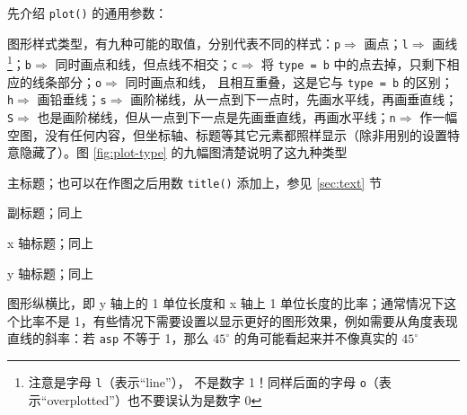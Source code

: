 \documentclass[
  b5paper,
  UTF8,twoside]{book}
\providecommand{\tightlist}{%
  \setlength{\itemsep}{0pt}\setlength{\parskip}{0pt}}
\begin{document}
先介绍 \texttt{plot()} 的通用参数：

\begin{description}
\tightlist
\item[\texttt{type}]
图形样式类型，有九种可能的取值，分别代表不同的样式：\texttt{\textquotesingle{}p\textquotesingle{}}\(\Rightarrow\) 画点；\texttt{\textquotesingle{}l\textquotesingle{}}\(\Rightarrow\) 画线 \footnote{注意是字母 \texttt{l}（表示``line''）， 不是数字 1！同样后面的字母 \texttt{o}（表示``overplotted''）也不要误认为是数字 0}；\texttt{\textquotesingle{}b\textquotesingle{}}\(\Rightarrow\) 同时画点和线，但点线不相交；\texttt{\textquotesingle{}c\textquotesingle{}}\(\Rightarrow\) 将 \texttt{type\ =\ \textquotesingle{}b\textquotesingle{}} 中的点去掉，只剩下相应的线条部分；\texttt{\textquotesingle{}o\textquotesingle{}}\(\Rightarrow\) 同时画点和线， 且相互重叠，这是它与 \texttt{type\ =\ \textquotesingle{}b\textquotesingle{}} 的区别；\texttt{\textquotesingle{}h\textquotesingle{}}\(\Rightarrow\) 画铅垂线；\texttt{\textquotesingle{}s\textquotesingle{}}\(\Rightarrow\) 画阶梯线，从一点到下一点时，先画水平线，再画垂直线；\texttt{\textquotesingle{}S\textquotesingle{}}\(\Rightarrow\) 也是画阶梯线，但从一点到下一点是先画垂直线，再画水平线；\texttt{\textquotesingle{}n\textquotesingle{}}\(\Rightarrow\) 作一幅空图，没有任何内容，但坐标轴、标题等其它元素都照样显示（除非用别的设置特意隐藏了）。图 \ref{fig:plot-type} 的九幅图清楚说明了这九种类型
\item[\texttt{main}]
主标题；也可以在作图之后用数 \texttt{title()} 添加上，参见 \ref{sec:text} 节
\item[\texttt{sub}]
副标题；同上
\item[\texttt{xlab}]
x 轴标题；同上
\item[\texttt{ylab}]
y 轴标题；同上
\item[\texttt{asp}]
图形纵横比，即 y 轴上的 1 单位长度和 x 轴上 1 单位长度的比率；通常情况下这个比率不是 1，有些情况下需要设置以显示更好的图形效果，例如需要从角度表现直线的斜率：若 \texttt{asp} 不等于 1，那么 \(45^{\circ}\) 的角可能看起来并不像真实的 \(45^{\circ}\)
\end{description}
\end{document}
